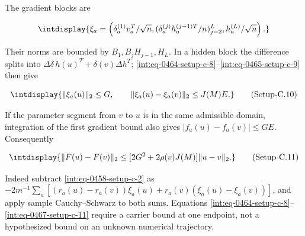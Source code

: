 
The gradient blocks are


\begingroup\renewcommand{\theHequation}{intdisplay.930}
\begin{equation*}
\intdisplay{
\xi_a=\left(\delta_a^{(1)}v_a^T/\sqrt n,
 (\delta_a^{(j)}h_a^{(j-1)T}/n)_{j=2}^L,h_a^{(L)}/\sqrt n\right).
}
\end{equation*}
\endgroup


Their norms are bounded by \(B_1,\allowbreak B_jH_{j-1},\allowbreak H_L\). In a hidden block the difference splits into \(\Delta\delta\,\allowbreak h(u)^T+\delta(v)\Delta h^T\); \hyperref[int:eq-setup-c-8]{\eqref{int:eq-0464-setup-c-8}}--\allowbreak \hyperref[int:eq-setup-c-9]{\eqref{int:eq-0465-setup-c-9}} then give


\label{int:eq-setup-c-10}
\begingroup\renewcommand{\theHequation}{intdisplay.931}
\begin{equation}
\intdisplay{
\|\xi_a(u)\|_2\le G,\qquad
\|\xi_a(u)-\xi_a(v)\|_2\le J(M)E.
}
\tag{Setup-C.10}
\label{int:eq-0466-setup-c-10}
\end{equation}
\endgroup


If the parameter segment from \(v\) to \(u\) is in the same admissible domain, integration of the first gradient bound also gives \(|f_a(u)-f_a(v)|\le GE\). Consequently


\label{int:eq-setup-c-11}
\begingroup\renewcommand{\theHequation}{intdisplay.932}
\begin{equation}
\intdisplay{
\|F(u)-F(v)\|_2
\le [2G^2+2\rho(v)J(M)]\|u-v\|_2.
}
\tag{Setup-C.11}
\label{int:eq-0467-setup-c-11}
\end{equation}
\endgroup


Indeed subtract \hyperref[int:eq-setup-c-2]{\eqref{int:eq-0458-setup-c-2}} as \(-2m^{-1}\sum_a[(r_a(u)-r_a(v))\xi_a(u) +r_a(v)(\xi_a(u)-\xi_a(v))]\), and apply sample Cauchy--Schwarz to both sums. Equations \hyperref[int:eq-setup-c-8]{\eqref{int:eq-0464-setup-c-8}}--\allowbreak \hyperref[int:eq-setup-c-11]{\eqref{int:eq-0467-setup-c-11}} require a carrier bound at one endpoint, not a hypothesized bound on an unknown numerical trajectory.


